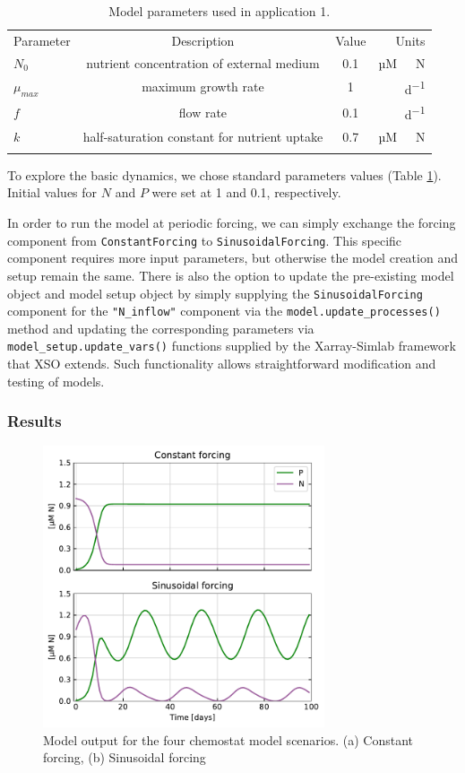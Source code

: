 \documentclass[journal abbreviation, manuscript]{copernicus}
\begin{document}
%
\begin{table}[t]
\caption{Model parameters used in application 1.}
\begin{tabular}{l c c r}
\tophline
Parameter & Description & Value & Units \\
\middlehline

$N_0$ & nutrient concentration of external medium & 0.1 & \unit{µM \ N} \\
$\mu_{max}$ & maximum growth rate & 1 & \unit{d^{-1}} \\
$f$ & flow rate & 0.1 & \unit{d^{-1}}\\
$k$ & half-saturation constant for nutrient uptake & 0.7 & \unit{µM \ N}\\

\bottomhline
\end{tabular}
\label{Table:UseCase1Parameters}
\end{table}
%

To explore the basic dynamics, we chose standard parameters values (Table \ref{Table:UseCase1Parameters}). Initial values for $N$ and $P$ were set at 1 and 0.1, respectively.

In order to run the model at periodic forcing, we can simply exchange the forcing component from \texttt{ConstantForcing} to \texttt{SinusoidalForcing}. This specific component requires more input parameters, but otherwise the model creation and setup remain the same. There is also the option to update the pre-existing model object and model setup object by simply supplying the \texttt{SinusoidalForcing} component for the \texttt{"N\_inflow"} component via the \texttt{model.update\_processes()} method and updating the corresponding parameters via \texttt{model\_setup.update\_vars()} functions supplied by the Xarray-Simlab framework that XSO extends. Such functionality allows straightforward modification and testing of models.

\subsubsection{Results}

\begin{figure}[t]
\includegraphics[width=8.3cm]{Figures/firstdraft_plots/01_chemostat_output.pdf}
\caption{Model output for the four chemostat model scenarios. (a) Constant forcing, (b) Sinusoidal forcing}
\label{Figure:ResultsChemostat}
\end{figure}
\end{document}
